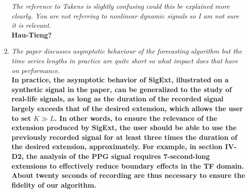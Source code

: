 \documentclass[11pt,DIV=16]{scrartcl}
\begin{document}
\begin{enumerate}[1)]
\textit{The reference to Takens is slightly confusing could this be explained more clearly. You are not referring to nonlinear dynamic signals so I am not sure it is relevant.} \\
\textbf{\color{blue} Hau-Tieng?}
\item
\textit{The paper discusses asymptotic behaviour of the forecasting algorithm but the time series lengths in practice are quite short so what impact does that have on performance.} \\
\textbf{In practice, the asymptotic behavior of \textsf{SigExt}, illustrated on a synthetic signal in the paper, can be generalized to the study of real-life signals, as long as the duration of the recorded signal largely exceeds that of the desired extension, which allows the user to set $K \gg L$. In other words, to ensure the relevance of the extension produced by \textsf{SigExt}, the user should be able to use the previously recorded signal for at least three times the duration of the desired extension, approximately. For example, in section IV-D2, the analysis of the PPG signal requires 7-second-long extensions to effectively reduce boundary effects in the TF domain. About twenty seconds of recording are thus necessary to ensure the fidelity of our algorithm.}
\end{enumerate}
\end{document}
